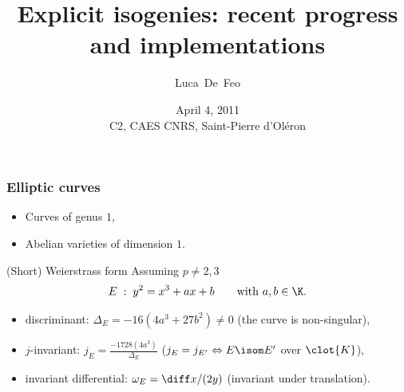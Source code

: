 \documentclass[10pt]{beamer}
\title[Explicit isogenies]{Explicit isogenies: recent progress and implementations}
\author{Luca~De~Feo}
\institute[IRMAR]{IRMAR, Université de Rennes 1}
\date[C2, April 4, 2011]{April 4, 2011\\C2, CAES CNRS, Saint-Pierre d'Oléron}
\begin{document}
\begin{frame}
  \titlepage
\end{frame}


\begin{frame}
  \frametitle{Elliptic curves}

  \begin{itemize}
  \item Curves of genus $1$,
  \item Abelian varieties of dimension $1$.
  \end{itemize}
  
  \begin{block}{(Short) Weierstrass form}
    Assuming $p\ne2,3$
    {\large
      \begin{equation*}
        E\;:\;y^2 = x^3 + ax + b\qquad\text{with $a,b\in\K$.}
      \end{equation*}
    }
    \begin{itemize}
    \item discriminant: \alert{$\Delta_E = -16(4a^3 + 27b^2) \ne 0$} (the curve is non-singular),
    \item $j$-invariant: \alert{$j_E=\frac{-1728(4a^3)}{\Delta_E}$}
      ($j_E=j_{E'} \Leftrightarrow E\isom E'$ over $\clot{K}$),
    \item invariant differential: \alert{$\omega_E= \diff x/(2y)$} (invariant under translation).
    \end{itemize}
  \end{block}
\end{frame}


\end{document}
